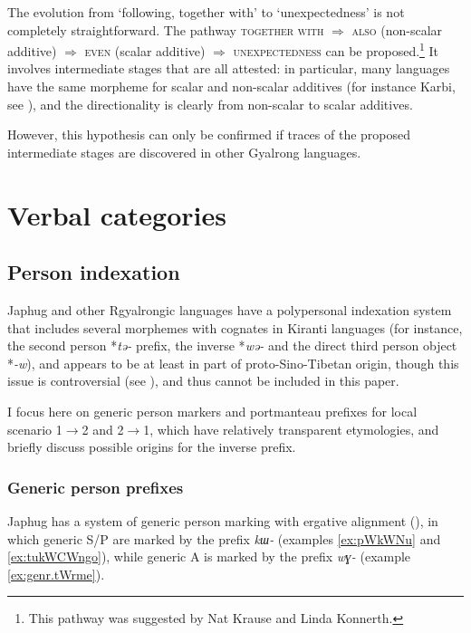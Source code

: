 \documentclass[oneside,a4paper,11pt]{article}
\newcommand{\ipa}[1]{\mbox{\phon\textit{#1}}} %
\begin{document}
The evolution from `following, together with' to `unexpectedness' is not completely straightforward. The pathway \textsc{together with} $\Rightarrow$ \textsc{also} (non-scalar additive) $\Rightarrow$ \textsc{even} (scalar additive) $\Rightarrow$ \textsc{unexpectedness} can be proposed.\footnote{This pathway was suggested by Nat Krause and Linda Konnerth.} It involves intermediate stages that are all attested: in particular, many languages have the same morpheme for scalar and non-scalar additives (for instance Karbi, see \citealt{konnerth14additive}), and the directionality is clearly from non-scalar to scalar additives.

However, this hypothesis can only be confirmed if traces of the proposed intermediate stages are discovered in other Gyalrong languages.

  \section{Verbal categories} 

\subsection{Person indexation} 
Japhug and other Rgyalrongic languages have a polypersonal indexation system that includes several morphemes with cognates in Kiranti languages (for instance, the second person *\ipa{tə-} prefix, the inverse *\ipa{wə-} and the direct third person object *\ipa{-w}), and appears to be at least in part of proto-Sino-Tibetan origin, though this issue is controversial (see \citealt{delancey11prefixes, jacques12agreement}), and thus cannot be included in this paper.


I focus here on generic person markers and portmanteau prefixes for local scenario 1$\rightarrow$2 and 2$\rightarrow$1, which have relatively transparent etymologies, and briefly discuss possible origins for the inverse prefix.


\subsubsection{Generic person prefixes}

Japhug has a system of generic person marking with ergative alignment (\citealt{jacques12demotion}), in which generic S/P are marked by the prefix \ipa{kɯ-} (examples \ref{ex:pWkWNu} and \ref{ex:tukWCWngo}), while generic A is marked by the prefix \ipa{wɣ-} (example \ref{ex:genr.tWrme}).
\end{document}
